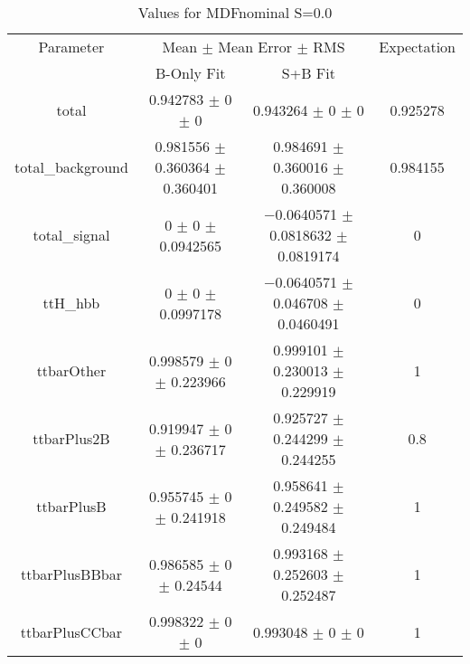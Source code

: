 \begin{table}
\centering
\caption{Values for MDFnominal S=0.0}
\begin{tabular}{cccc}
\toprule
Parameter & \multicolumn{2}{c}{Mean $\pm$ Mean Error $\pm$ RMS} & Expectation\\
 & B-Only Fit & S+B Fit & \\
\midrule
total & \num{0.942783} $\pm$ \num{0} $\pm$ \num{0} & \num{0.943264} $\pm$ \num{0} $\pm$ \num{0} & \num{0.925278}\\
total\_background & \num{0.981556} $\pm$ \num{0.360364} $\pm$ \num{0.360401} & \num{0.984691} $\pm$ \num{0.360016} $\pm$ \num{0.360008} & \num{0.984155}\\
total\_signal & \num{0} $\pm$ \num{0} $\pm$ \num{0.0942565} & \num{-0.0640571} $\pm$ \num{0.0818632} $\pm$ \num{0.0819174} & \num{0}\\
ttH\_hbb & \num{0} $\pm$ \num{0} $\pm$ \num{0.0997178} & \num{-0.0640571} $\pm$ \num{0.046708} $\pm$ \num{0.0460491} & \num{0}\\
ttbarOther & \num{0.998579} $\pm$ \num{0} $\pm$ \num{0.223966} & \num{0.999101} $\pm$ \num{0.230013} $\pm$ \num{0.229919} & \num{1}\\
ttbarPlus2B & \num{0.919947} $\pm$ \num{0} $\pm$ \num{0.236717} & \num{0.925727} $\pm$ \num{0.244299} $\pm$ \num{0.244255} & \num{0.8}\\
ttbarPlusB & \num{0.955745} $\pm$ \num{0} $\pm$ \num{0.241918} & \num{0.958641} $\pm$ \num{0.249582} $\pm$ \num{0.249484} & \num{1}\\
ttbarPlusBBbar & \num{0.986585} $\pm$ \num{0} $\pm$ \num{0.24544} & \num{0.993168} $\pm$ \num{0.252603} $\pm$ \num{0.252487} & \num{1}\\
ttbarPlusCCbar & \num{0.998322} $\pm$ \num{0} $\pm$ \num{0} & \num{0.993048} $\pm$ \num{0} $\pm$ \num{0} & \num{1}\\
\bottomrule
\end{tabular}
\end{table}